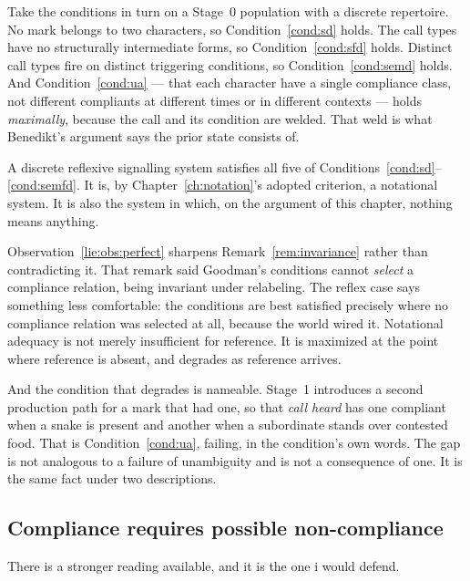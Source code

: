 Take the conditions in turn on a Stage~0 population with a discrete repertoire.
No mark belongs to two characters, so Condition~\ref{cond:sd} holds. The call
types have no structurally intermediate forms, so Condition~\ref{cond:sfd}
holds. Distinct call types fire on distinct triggering conditions, so
Condition~\ref{cond:semd} holds. And Condition~\ref{cond:ua} --- that each
character have a single compliance class, not different compliants at different
times or in different contexts --- holds \emph{maximally}, because the call and
its condition are welded. That weld is what Benedikt's argument says the prior
state consists of.

\begin{observation}
\label{lie:obs:perfect}
A discrete reflexive signalling system satisfies all five of
Conditions~\ref{cond:sd}--\ref{cond:semfd}. It is, by
Chapter~\ref{ch:notation}'s adopted criterion, a notational system. It is also
the system in which, on the argument of this chapter, nothing means anything.
\end{observation}

Observation~\ref{lie:obs:perfect} sharpens Remark~\ref{rem:invariance} rather
than contradicting it. That remark said Goodman's conditions cannot
\emph{select} a compliance relation, being invariant under relabeling. The
reflex case says something less comfortable: the conditions are best satisfied
precisely where no compliance relation was selected at all, because the world
wired it. Notational adequacy is not merely insufficient for reference. It is
maximized at the point where reference is absent, and degrades as reference
arrives.

And the condition that degrades is nameable. Stage~1 introduces a second
production path for a mark that had one, so that \emph{call heard} has one
compliant when a snake is present and another when a subordinate stands over
contested food. That is Condition~\ref{cond:ua}, failing, in the condition's own
words. The gap is not analogous to a failure of unambiguity and is not a
consequence of one. It is the same fact under two descriptions.

\subsection{Compliance requires possible non-compliance}
\label{sec:possible-noncompliance}

There is a stronger reading available, and it is the one i would defend.

